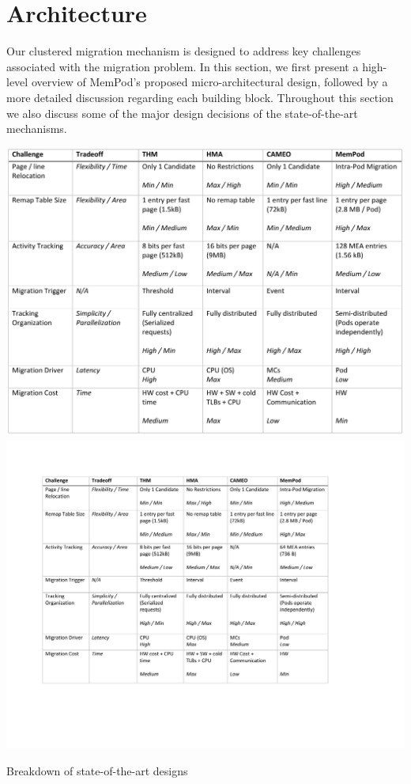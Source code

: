 \section{Architecture}
\label{sec:Architecture}

Our clustered migration mechanism is designed to address key challenges associated with the migration problem. In this section, we first present a high-level overview of MemPod's proposed micro-architectural design, followed by a more detailed discussion regarding each building block. Throughout this section we also discuss some of the major design decisions of the state-of-the-art mechanisms.



\begin{table}[t]
  \ifOldResults
  \includegraphics[width=\linewidth]{figures/comparison_table.pdf}
  \else
  \includegraphics[width=\textwidth]{figures/revised/new/comparison_table.pdf}
  \fi
  \caption{Breakdown of state-of-the-art designs}
  \label{tbl:breakdown}
\end{table}

